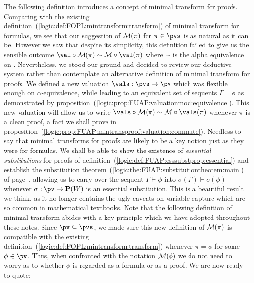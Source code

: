 The following definition introduces a concept of minimal transform
for proofs. Comparing with the existing
definition~(\ref{logic:def:FOPL:mintransform:transform}) of minimal
transform for formulas, we see that our suggestion of ${\cal
M}(\pi)$ for $\pi\in\pvs$ is as natural as it can be. However we saw
that despite its simplicity, this definition failed to give us the
sensible outcome $\val\circ{\cal M}(\pi)\sim{\cal M}\circ\val(\pi)$
where $\sim$ is the alpha equivalence on \pvb. Nevertheless,
we stood our ground and decided to review our deductive system
rather than contemplate an alternative definition of minimal
transform for proofs. We defined a new valuation $\vals:\pvs\to\pv$
which was flexible enough on $\alpha$-equivalence, while leading to
an equivalent set of sequents $\Gamma\vdash\phi$ as demonstrated by
proposition~(\ref{logic:prop:FUAP:valuationmod:equivalence}). This
new valuation will allow us to write $\vals\circ{\cal
M}(\pi)\sim{\cal M}\circ\vals(\pi)$ whenever $\pi$ is a clean proof,
a fact we shall prove in
proposition~(\ref{logic:prop:FUAP:mintransproof:valuation:commute}).
Needless to say that minimal transforms for proofs are likely to be
a key notion just as they were for formulas. We shall be able to
show the existence of {\em essential substitutions} for proofs of
definition~(\ref{logic:def:FUAP:esssubstprop:essential}) and
establish the substitution
theorem~(\ref{logic:the:FUAP:substitutiontheorem:main}) of
page~\pageref{logic:the:FUAP:substitutiontheorem:main}, allowing us
to carry over the sequent $\Gamma\vdash\phi$ into
$\sigma(\Gamma)\vdash\sigma(\phi)$ whenever $\sigma:\pv\to{\bf
P}(W)$ is an essential substitution. This is a beautiful result we
think, as it no longer contains the ugly caveats on variable capture
which are so common in mathematical textbooks. Note that the
following definition of minimal transform abides with a key
principle which we have adopted throughout these notes. Since
$\pv\subseteq\pvs$, we made sure this new definition of ${\cal
M}(\pi)$ is compatible with the existing
definition~(\ref{logic:def:FOPL:mintransform:transform}) whenever
$\pi=\phi$ for some $\phi\in\pv$. Thus, when confronted with the
notation ${\cal M}(\phi)$ we do not need to worry as to whether
$\phi$ is regarded as a formula or as a proof. We are now ready to
quote:

